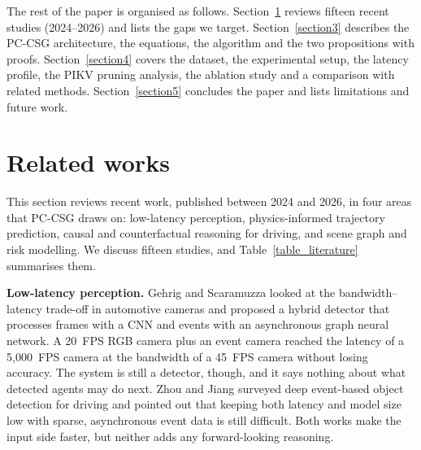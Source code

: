 \documentclass[preprint,12pt]{elsarticle}
\begin{document}
The rest of the paper is organised as follows. Section~\ref{section2} reviews fifteen recent studies (2024--2026) and lists the gaps we target. Section~\ref{section3} describes the PC-CSG architecture, the equations, the algorithm and the two propositions with proofs. Section~\ref{section4} covers the dataset, the experimental setup, the latency profile, the PIKV pruning analysis, the ablation study and a comparison with related methods. Section~\ref{section5} concludes the paper and lists limitations and future work.

\section{Related works} \label{section2}
This section reviews recent work, published between 2024 and 2026, in four areas that PC-CSG draws on: low-latency perception, physics-informed trajectory prediction, causal and counterfactual reasoning for driving, and scene graph and risk modelling. We discuss fifteen studies, and Table~\ref{table_literature} summarises them.

\textbf{Low-latency perception.} Gehrig and Scaramuzza \cite{gehrig2024low} looked at the bandwidth--latency trade-off in automotive cameras and proposed a hybrid detector that processes frames with a CNN and events with an asynchronous graph neural network. A 20~FPS RGB camera plus an event camera reached the latency of a 5,000~FPS camera at the bandwidth of a 45~FPS camera without losing accuracy. The system is still a detector, though, and it says nothing about what detected agents may do next. Zhou and Jiang \cite{zhou2024event} surveyed deep event-based object detection for driving and pointed out that keeping both latency and model size low with sparse, asynchronous event data is still difficult. Both works make the input side faster, but neither adds any forward-looking reasoning.
\end{document}
